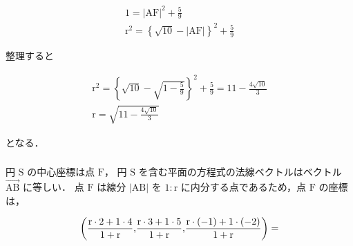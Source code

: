 \begin{align*}
  1 = {\lvert\mathrm{AF}\lvert}^2 + \frac{5}{9} \\
  {\mathrm{r}}^2 = \left\{\sqrt{10} - \lvert\mathrm{AF}\lvert\right\}^2 + \frac{5}{9}
\end{align*}

整理すると

\begin{align*}
  {\mathrm{r}}^2 = \left\{\sqrt{10} - \sqrt{1 - \frac{5}{9}}\right\}^2 + \frac{5}{9} = 11 - \frac{4\sqrt{10}}{3} \\
  \mathrm{r} = \sqrt{11 - \frac{4\sqrt{10}}{3}}
\end{align*}

となる．

\subsubsection{}

円 $\mathrm{S}$ の中心座標は点 $\mathrm{F}$，
円 $\mathrm{S}$ を含む平面の方程式の法線ベクトルはベクトル 
$\overrightarrow{\mathrm{AB}}$ に等しい．
点 $\mathrm{F}$ は線分 $\lvert\mathrm{AB}\lvert$ を $1\colon\mathrm{r}$ に内分する点であるため，点 $\mathrm{F}$ の座標は，

\begin{align*}
  \left\lparen {\frac{\mathrm{r} \cdot 2 + 1 \cdot 4}{1 + \mathrm{r}}} {,} {\frac{\mathrm{r} \cdot 3 + 1 \cdot 5}{1 + \mathrm{r}}} {,} {\frac{\mathrm{r} \cdot (-1) + 1 \cdot (-2)}{1 + \mathrm{r}}} \right\rparen
  =
\end{align*}

\subsection{}

\subsection{}